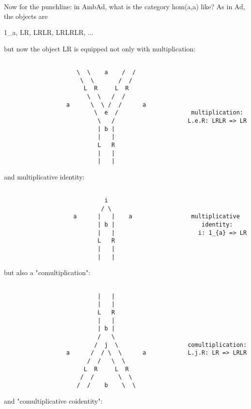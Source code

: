 Now for the punchline: in AmbAd, what is the category hom(a,a) like?
As in Ad, the objects are

1_{a}, LR, LRLR, LRLRLR, ...

but now the object LR is equipped not only with multiplication:


\begin{verbatim}

                     \  \    a    /  /  
                      \  \       /  /
                       L  R     L  R
                        \  \   /  /
                  a      \  \ /  /      a      
                          \  e  /                     multiplication:
                           \   /                     L.e.R: LRLR => LR 
                           | b |
                           |   |
                           L   R
                           |   |
                           |   |   
\end{verbatim}
    
and multiplicative identity:


\begin{verbatim}

                             i
                            / \
                    a      |   |    a                 multiplicative
                           | b |                         identity:
                           |   |                        i: 1_{a} => LR
                           L   R   
                           |   |
                           |   |

\end{verbatim}
    
but also a "comultiplication":
 

\begin{verbatim}

                           |   |
                           |   |   
                           L   R
                           |   |
                           | b |
                           /   \                           
                          /  j  \                    comultiplication:
                  a      /  / \  \      a            L.j.R: LR => LRLR
                        /  /   \  \
                       L  R     L  R
                      /  /       \  \
                     /  /    b    \  \ 
\end{verbatim}
    
and "comultiplicative coidentity":




